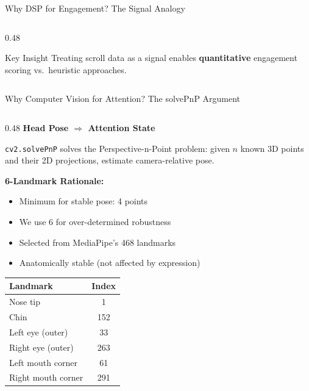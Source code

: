 \documentclass[aspectratio=169,10pt]{beamer}
\begin{document}
\begin{frame}{Why DSP for Engagement? The Signal Analogy}
\begin{columns}[T]
\begin{column}{0.48\textwidth}
\vspace{4pt}
\begin{block}{\scriptsize Key Insight}
\scriptsize Treating scroll data as a signal enables \textbf{quantitative} engagement scoring vs.\ heuristic approaches.
\end{block}
\end{column}
\end{columns}
\end{frame}

\begin{frame}{Why Computer Vision for Attention? The solvePnP Argument}
\begin{columns}[T]
\begin{column}{0.48\textwidth}
\textbf{Head Pose $\Rightarrow$ Attention State}

\vspace{4pt}
\footnotesize
\texttt{cv2.solvePnP} solves the Perspective-n-Point problem: given $n$ known 3D points and their 2D projections, estimate camera-relative pose.

\vspace{6pt}
\textbf{6-Landmark Rationale:}
\begin{itemize}\scriptsize
  \item Minimum for stable pose: 4 points
  \item We use 6 for over-determined robustness
  \item Selected from MediaPipe's 468 landmarks
  \item Anatomically stable (not affected by expression)
\end{itemize}

\vspace{4pt}
\begin{tabular}{@{}lc@{}}
\toprule
\textbf{Landmark} & \textbf{Index} \\
\midrule
Nose tip & 1 \\
Chin & 152 \\
Left eye (outer) & 33 \\
Right eye (outer) & 263 \\
Left mouth corner & 61 \\
Right mouth corner & 291 \\
\bottomrule
\end{tabular}
\end{column}


\end{columns}
\end{frame}
\end{document}
